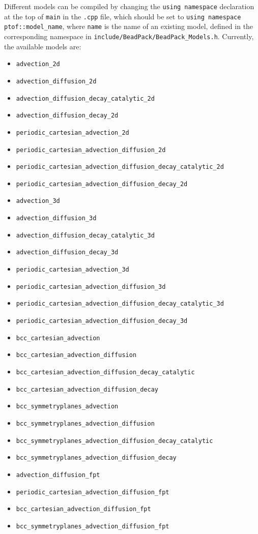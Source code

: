 \documentclass[11pt]{article}
\begin{document}
Different models can be compiled by changing the \lstinline{using namespace} declaration at the top of \lstinline{main} in the \lstinline{.cpp} file, which should be set to \lstinline{using namespace ptof::model_name}, where \lstinline{name} is the name of an existing model, defined in the corresponding namespace in \lstinline{include/BeadPack/BeadPack_Models.h}. Currently, the available models are:
%
\begin{itemize}
\item \lstinline{advection_2d}
\item \lstinline{advection_diffusion_2d}
\item \lstinline{advection_diffusion_decay_catalytic_2d}
\item \lstinline{advection_diffusion_decay_2d}
\item \lstinline{periodic_cartesian_advection_2d}
\item \lstinline{periodic_cartesian_advection_diffusion_2d}
\item \lstinline{periodic_cartesian_advection_diffusion_decay_catalytic_2d}
\item \lstinline{periodic_cartesian_advection_diffusion_decay_2d}
\item \lstinline{advection_3d}
\item \lstinline{advection_diffusion_3d}
\item \lstinline{advection_diffusion_decay_catalytic_3d}
\item \lstinline{advection_diffusion_decay_3d}
\item \lstinline{periodic_cartesian_advection_3d}
\item \lstinline{periodic_cartesian_advection_diffusion_3d}
\item \lstinline{periodic_cartesian_advection_diffusion_decay_catalytic_3d}
\item \lstinline{periodic_cartesian_advection_diffusion_decay_3d}
\item \lstinline{bcc_cartesian_advection}
\item \lstinline{bcc_cartesian_advection_diffusion}
\item \lstinline{bcc_cartesian_advection_diffusion_decay_catalytic}
\item \lstinline{bcc_cartesian_advection_diffusion_decay}
\item \lstinline{bcc_symmetryplanes_advection}
\item \lstinline{bcc_symmetryplanes_advection_diffusion}
\item \lstinline{bcc_symmetryplanes_advection_diffusion_decay_catalytic}
\item \lstinline{bcc_symmetryplanes_advection_diffusion_decay}
\item \lstinline{advection_diffusion_fpt}
\item \lstinline{periodic_cartesian_advection_diffusion_fpt}
\item \lstinline{bcc_cartesian_advection_diffusion_fpt}
\item \lstinline{bcc_symmetryplanes_advection_diffusion_fpt}
\end{itemize}
\end{document}
